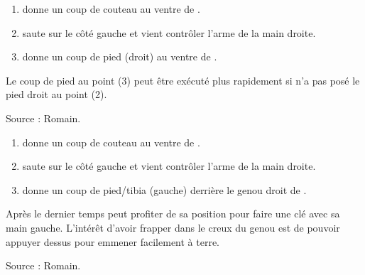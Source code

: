 \begin{technique}

\begin{enumerate}
	\item \A donne un coup de couteau au ventre de \D.
	
	\item \D saute sur le côté gauche et vient contrôler l'arme de la main droite.
	
	\item \D donne un coup de pied (droit) au ventre de \A.
\end{enumerate}

Le coup de pied au point (3) peut être exécuté plus rapidement si \D n'a pas posé le pied droit au point (2).

Source : Romain.

\end{technique}


\begin{technique}

\begin{enumerate}
	\item \A donne un coup de couteau au ventre de \D.
	
	\item \D saute sur le côté gauche et vient contrôler l'arme de la main droite.
	
	\item \D donne un coup de pied/tibia (gauche) derrière le genou droit de \A.
\end{enumerate}

Après le dernier temps \D peut profiter de sa position pour faire une clé avec sa main gauche.
L'intérêt d'avoir frapper dans le creux du genou est de pouvoir appuyer dessus pour emmener facilement \A à terre.

Source : Romain.

\end{technique}


